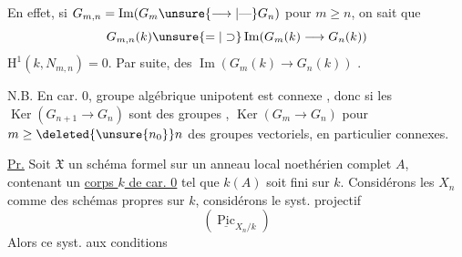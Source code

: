 


En effet, si $G_{m,n}=\operatorname{Im}(G_m\unsure{\longrightarrow|\text{---}}G_n)$ pour $m\geq n$, on sait que
\[
G_{m,n}(k)\unsure{=|\supset}\operatorname{Im}(G_m(k)\longrightarrow G_n(k))
\]
 $\mathrm H^1(k,N_{m,n})=0$. Par suite,   des $\operatorname{Im}(G_m(k)\longrightarrow G_n(k))$  .

N.B. En car. 0,  groupe algébrique  unipotent est connexe , donc si les $\operatorname{Ker}(G_{n+1}\longrightarrow G_n)$ sont des groupes ,   $\operatorname{Ker}(G_m\longrightarrow G_n)$ pour $m\geq\deleted{\unsure{n_0}}n$  des groupes vectoriels, en particulier connexes.


\uline{Pr.} Soit $\mathfrak X$ un schéma formel  sur un anneau local noethérien complet $A$, contenant un \uline{corps $k$ de car. 0} tel que  $k(A)$ soit fini sur $k$. Considérons les $X_n$ comme des schémas propres sur $k$,  considérons le syst. projectif
\[
(\underline{\operatorname{Pic}}_{X_n/k})
\]
Alors ce syst.  aux conditions


